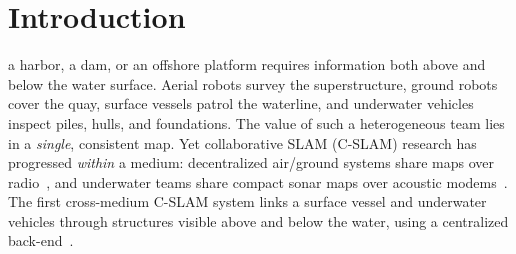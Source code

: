 \section{Introduction}
\label{sec:intro}

 a harbor, a dam, or an offshore platform requires information both
above and below the water surface. Aerial robots survey the superstructure, ground robots
cover the quay, surface vessels patrol the waterline, and underwater vehicles inspect piles,
hulls, and foundations. The value of such a heterogeneous team lies in a \emph{single},
consistent map. Yet collaborative SLAM (C-SLAM) research has progressed \emph{within} a medium:
decentralized air/ground systems share maps over radio~\cite{tian2022kimeramulti,
lajoie2024swarmslam, liu2025slideslam}, and underwater teams share compact sonar maps over
acoustic modems~\cite{huang2025draco2}. The first cross-medium C-SLAM system links a surface
vessel and underwater vehicles through structures visible above and below the water, using a
centralized back-end~\cite{mcconnell2026aboveandbelow}.




